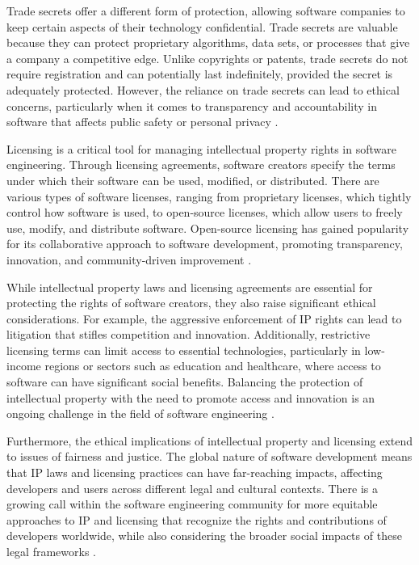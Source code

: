 \begin{refsection}
Trade secrets offer a different form of protection, allowing software companies to keep certain aspects of their technology confidential. Trade secrets are valuable because they can protect proprietary algorithms, data sets, or processes that give a company a competitive edge. Unlike copyrights or patents, trade secrets do not require registration and can potentially last indefinitely, provided the secret is adequately protected. However, the reliance on trade secrets can lead to ethical concerns, particularly when it comes to transparency and accountability in software that affects public safety or personal privacy \cite[pp.~67-69]{friedman1998privileged}.

Licensing is a critical tool for managing intellectual property rights in software engineering. Through licensing agreements, software creators specify the terms under which their software can be used, modified, or distributed. There are various types of software licenses, ranging from proprietary licenses, which tightly control how software is used, to open-source licenses, which allow users to freely use, modify, and distribute software. Open-source licensing has gained popularity for its collaborative approach to software development, promoting transparency, innovation, and community-driven improvement \cite[pp.~25-27]{raymond2001cathedral}.

While intellectual property laws and licensing agreements are essential for protecting the rights of software creators, they also raise significant ethical considerations. For example, the aggressive enforcement of IP rights can lead to litigation that stifles competition and innovation. Additionally, restrictive licensing terms can limit access to essential technologies, particularly in low-income regions or sectors such as education and healthcare, where access to software can have significant social benefits. Balancing the protection of intellectual property with the need to promote access and innovation is an ongoing challenge in the field of software engineering \cite[pp.~99-101]{lessig2004free}.

Furthermore, the ethical implications of intellectual property and licensing extend to issues of fairness and justice. The global nature of software development means that IP laws and licensing practices can have far-reaching impacts, affecting developers and users across different legal and cultural contexts. There is a growing call within the software engineering community for more equitable approaches to IP and licensing that recognize the rights and contributions of developers worldwide, while also considering the broader social impacts of these legal frameworks \cite[pp.~145-147]{benkler2006wealth}.


\end{refsection}
